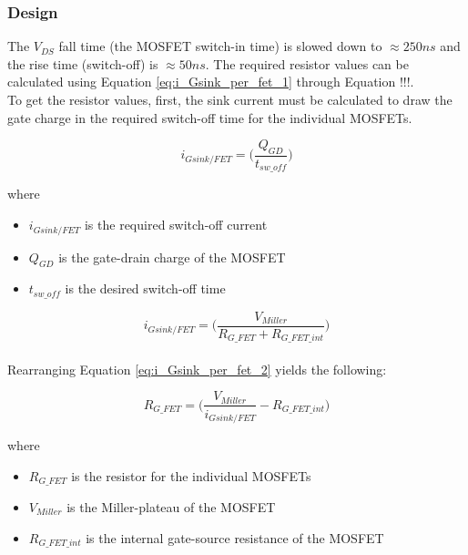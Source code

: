 \subsubsection{Design}
\label{sec:DriverDesign}

The $V_{DS}$ fall time (the MOSFET switch-in time) is slowed down to $\approx 250ns$ and the rise time (switch-off) is $\approx 50ns$. The required resistor values can be calculated using Equation \ref{eq:i_Gsink_per_fet_1} through Equation !!!. \\

To get the resistor values, first, the sink current must be calculated to draw the gate charge in the required switch-off time for the individual MOSFETs. 

    \begin{equation}
        i_{Gsink/FET} = \bigg( \frac{Q_{GD}}{t_{sw{\_}off}} \bigg)
        \label{eq:i_Gsink_per_fet_1}
    \end{equation}
    
    where
    
    \begin{itemize}
        \item $i_{Gsink/FET}$ is the required switch-off current
        \item $Q_{GD}$ is the gate-drain charge of the MOSFET
        \item $t_{sw{\_}off}$ is the desired switch-off time
    \end{itemize}
    
    \begin{equation}
        i_{Gsink/FET} = \bigg( \frac{V_{Miller}}{R_{G{\_}FET} + R_{G{\_}FET{\_}int}} \bigg)
        \label{eq:i_Gsink_per_fet_2}
    \end{equation} \\
    
    Rearranging Equation \ref{eq:i_Gsink_per_fet_2} yields the following:
    
    \begin{equation}
        R_{G{\_}FET} = \bigg( \frac{V_{Miller}}{i_{Gsink/FET}} - R_{G{\_}FET{\_}int} \bigg)
        \label{eq:i_Gsink_per_fet_2}
    \end{equation}
    
    where
    
    \begin{itemize}
        \item $R_{G{\_}FET}$ is the resistor for the individual MOSFETs
        \item $V_{Miller}$ is the Miller-plateau of the MOSFET
        \item $R_{G{\_}FET{\_}int}$ is the internal gate-source resistance of the MOSFET
    \end{itemize}
    
